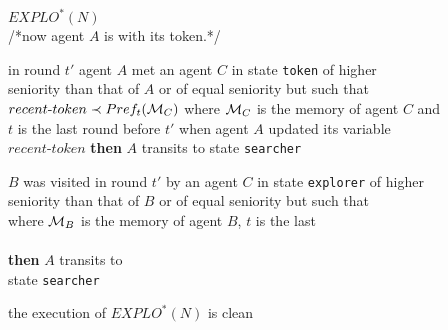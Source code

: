 \documentclass[11pt]{article}
\newcommand{\cM}{{\cal M}}
\begin{document}
 \noindent
  \hspace*{0.5cm}{\bf do}\\
   \noindent
 \hspace*{1cm}$EXPLO^*(N)$\\
  \noindent
  \hspace*{1cm}/*now agent $A$ is with its token.*/
 
 \vspace*{0.2cm}
  \noindent
  \hspace*{1cm}{\bf if} {in round $t'$} agent $A$ met an agent $C$ in state {\tt token} of higher\\
   \noindent
  \hspace*{1cm}seniority than that of $A$ or of equal seniority but such
  that \\ 
   \noindent
   \hspace*{1cm}$recent\mbox{-}token\prec Pref_t( \cM_C)$ where $\cM_C$ is the memory of agent $C$ and\\
    \noindent 
    \hspace*{1cm}$t$ is the last round {before $t'$}
    when agent $A$ updated its variable \\
    \noindent 
    \hspace*{1cm}$recent$-$token$ {\bf then} $A$ transits to state {\tt searcher}
    
    \vspace*{0.2cm}
     \noindent
     \hspace*{1cm}{\bf if} $B$ was visited in round $t'$ by an agent $C$ in state {\tt explorer} of higher\\ 
      \noindent 
    \hspace*{1cm}seniority than that of $B$
     or of equal seniority but such that\\
      \noindent 
      \hspace*{1cm}{$Pref_t(\cM_B) \prec R$} where $\cM_B$ is the memory of agent $B$, $t$ is the last \\
       \noindent 
      \hspace*{1cm}{
round before $t'$ when agent $C$ updated its variable $recent$-$token$ and $R$}\\ 
\noindent 
      \hspace*{1cm}{is the variable $recent$-$token$ of agent $C$ in round $t'$} {\bf then} $A$ transits to \\
\noindent 
      \hspace*{1cm}state {\tt searcher}
    
     \vspace*{0.2cm}
     \noindent
       \hspace*{0.5cm}{\bf until} the execution of $EXPLO^*(N)$ is clean\\
\end{document}
